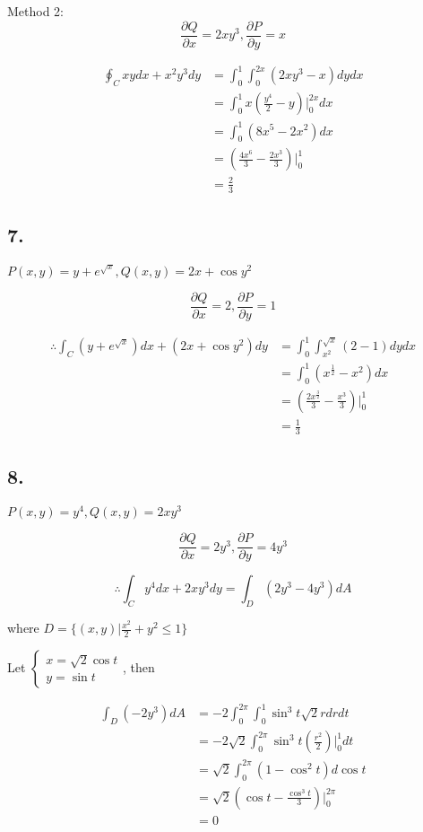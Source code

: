 \documentclass{article}
\begin{document}
  Method 2: $$\frac{\partial Q}{\partial x} = 2xy^3, \frac{\partial P}{\partial y} =  x$$

  $$\begin{aligned}
    \oint_{C} xydx + x^2y^3 dy &= \int_0^1 \int_0^{2x} (2xy^3 - x) dy dx \\
    &= \int_0^1 x(\frac{y^4}{2}-y)\biggl|_0^{2x} dx \\
    &= \int_0^1 (8x^5 - 2x^2) dx \\
    &=  (\frac{4x^6}{3} - \frac{2x^3}{3})\biggl|_0^1 \\
    &= \frac 2 3
  \end{aligned}$$

  \subsection*{7. }

  $P(x, y) = y + e^{\sqrt x} , Q(x, y) = 2x + \cos y^2$

  $$\frac{\partial Q}{\partial x} = 2, \frac{\partial P}{\partial y} = 1$$

  $$\begin{aligned}
    \therefore \int_C (y+e^{\sqrt x}) dx + (2x + \cos y^2) dy &= \int_0^1 \int_{x^2}^{\sqrt x} (2 - 1) dy dx \\
    &= \int_0^1 (x^{\frac 1 2} - x^2) dx \\
    &= (\frac{2x^{\frac 3 2}}{3} - \frac{x^3}{3})\biggl|_0^1 \\
    &= \frac 1 3
  \end{aligned}$$

  \subsection*{8. }

  $P(x, y) = y^4, Q(x, y) = 2xy^3$

  $$\frac{\partial Q}{\partial x} = 2y^3, \frac{\partial P}{\partial y} = 4y^3$$

  $$\therefore \int_C y^4 dx + 2xy^3 dy = \int_D (2y^3 - 4y^3) dA$$

  where $D = \{ (x, y) | \frac{x^2}{2} + y^2 \leq 1 \}$

  Let $\left \{ \begin{array}{ll} x = \sqrt{2} \cos t \\ y = \sin t \end{array}\right.$, then

  $$\begin{aligned}
    \int_D (-2y^3) dA &= -2\int_0^{2\pi} \int_0^1 \sin^3 t \sqrt 2 r dr dt \\
    &= -2\sqrt 2 \int_0^{2\pi} \sin^3 t (\frac{r^2}{2})\biggl|_0^1 dt \\
    &= \sqrt 2 \int_0^{2\pi} (1-\cos^2 t) d\cos t \\
    &= \sqrt 2 (\cos t - \frac{\cos^3 t}{3})\biggl|_0^{2\pi} \\
    &= 0
  \end{aligned}$$
\end{document}
